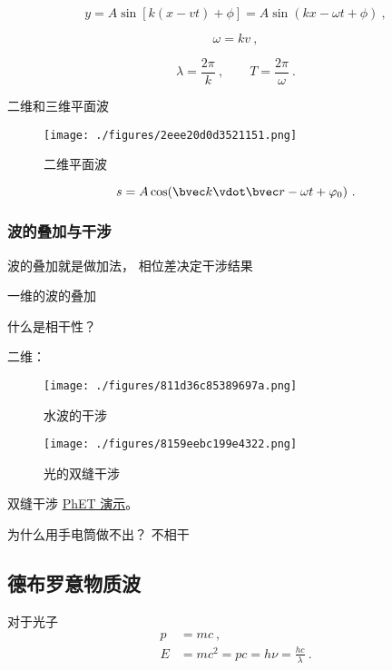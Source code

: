 \begin{equation}
y = A \sin[k(x-vt) + \phi] = A \sin(kx - \omega t + \phi)~,
\end{equation}

\begin{equation}
\omega = kv~,
\end{equation}

\begin{equation}
\lambda = \frac{2\pi}{k}~,
\qquad
T = \frac{2\pi}{\omega}~.
\end{equation}

二维和三维平面波

\begin{figure}[ht]
\centering
\texttt{[image: ./figures/2eee20d0d3521151.png]}
\caption{二维平面波} \label{fig_QMIntr_6}
\end{figure}

\begin{equation}
s = A \cos(\bvec k \vdot \bvec r - \omega t + \varphi_0)~.
\end{equation}


\subsubsection{波的叠加与干涉}

波的叠加就是做加法， 相位差决定干涉结果

一维的波的叠加

什么是相干性？

二维：

\begin{figure}[ht]
\centering
\texttt{[image: ./figures/811d36c85389697a.png]}
\caption{水波的干涉} \label{fig_QMIntr_4}
\end{figure}

\begin{figure}[ht]
\centering
\texttt{[image: ./figures/8159eebc199e4322.png]}
\caption{光的双缝干涉} \label{fig_QMIntr_5}
\end{figure}

双缝干涉 \href{https://phet.colorado.edu/sims/html/wave-interference/latest/wave-interference_en.html}{PhET 演示}。

为什么用手电筒做不出？ 不相干

\subsection{德布罗意物质波}

对于光子
\begin{equation}
\begin{aligned}
p &= mc~,
\\
E &= mc^2 = pc = h\nu = \frac{hc}{\lambda}~.
\end{aligned}
\end{equation}

